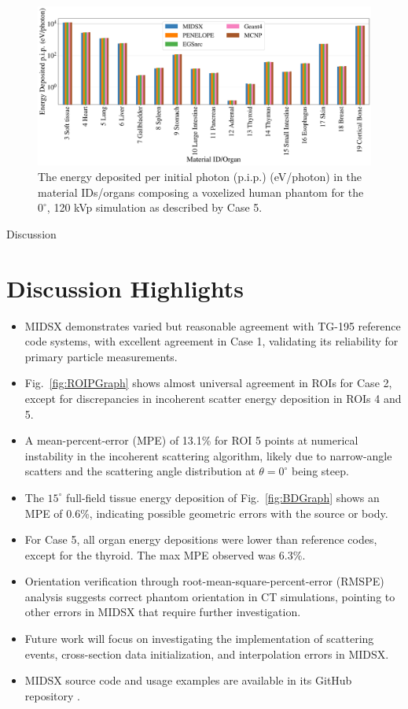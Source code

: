 \documentclass[final]{beamer}
\newlength{\colwidth}
\begin{document}
\begin{frame}[t]
\begin{columns}[t]
\begin{column}{\colwidth}
    \begin{figure}
      \centering
    \includegraphics[width= \colwidth]{CT_120_0_big_font.pdf}
    \caption{The energy deposited per initial photon (p.i.p.) (eV/photon) in the material IDs/organs composing a voxelized human phantom for the $0^\circ$, 120 kVp simulation as described by Case 5.}
    \label{fig:CTGraph}
    \end{figure}
  

  \begin{block}{Discussion}
    \section*{Discussion Highlights}

  \begin{itemize}
      \item MIDSX demonstrates varied but reasonable agreement with TG-195 reference code systems, with excellent agreement in Case 1, validating its reliability for primary particle measurements.
      \item Fig.~\ref{fig:ROIPGraph} shows almost universal agreement in ROIs for Case 2, except for discrepancies in incoherent scatter energy deposition in ROIs 4 and 5.
      \item A mean-percent-error (MPE) of 13.1\% for ROI 5 points at numerical instability in the incoherent scattering algorithm, likely due to narrow-angle scatters and the scattering angle distribution at $\theta = 0^\circ$ being steep.
      \item The $15^\circ$ full-field tissue energy deposition of Fig.~\ref{fig:BDGraph} shows an MPE of 0.6\%, indicating possible geometric errors with the source or body.
      \item For Case 5, all organ energy depositions were lower than reference codes, except for the thyroid. The max MPE observed was 6.3\%.
      \item Orientation verification through root-mean-square-percent-error (RMSPE) analysis suggests correct phantom orientation in CT simulations, pointing to other errors in MIDSX that require further investigation.
      \item Future work will focus on investigating the implementation of scattering events, cross-section data initialization, and interpolation errors in MIDSX.
      \item MIDSX source code and usage examples are available in its GitHub repository \cite{MIDSX2023}.
  \end{itemize}
    

\end{block}
\end{column}
\end{columns}
\end{frame}
\end{document}
